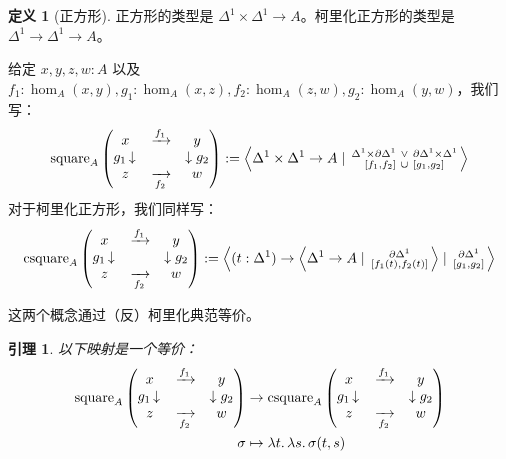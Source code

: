 \documentclass{ctexrep}
\theoremstyle{plain}
\newtheorem{lemma}[theorem]{引理}
\theoremstyle{definition}
\newtheorem{definition}[theorem]{定义}
\theoremstyle{remark}
\theoremstyle{definition}
\theoremstyle{definition}
\theoremstyle{definition}
\begin{document}
\begin{definition}[正方形]
正方形的类型是 $\Delta^1 \times \Delta^1 \to A$。柯里化正方形的类型是 $\Delta^1 \to \Delta^1 \to A$。

给定 $x,y,z,w:A$ 以及 $f_1:\hom_A(x,y), g_1:\hom_A(x,z), f_2:\hom_A(z,w), g_2:\hom_A(y,w)$，我们写：
\[
\text{square}_A \left( 
\begin{matrix} 
x & \xrightarrow{f_1} & y \\ 
g_1 \left\downarrow \rule{0pt}{1.5ex} \right. & & \left\downarrow \rule{0pt}{1.5ex} \right. g_2 \\ 
z & \xrightarrow[f_2]{} & w 
\end{matrix} 
\right) := \left\langle \Delta^1 \times \Delta^1 \to A \mid \begin{smallmatrix} \Delta^1 \times \partial\Delta^1 \ \lor \ \partial\Delta^1 \times \Delta^1 \\ [f_1, f_2] \ \cup \ [g_1, g_2] \end{smallmatrix} \right\rangle
\]
对于柯里化正方形，我们同样写：
\[
\text{csquare}_A \left( 
\begin{matrix} 
x & \xrightarrow{f_1} & y \\ 
g_1 \left\downarrow \rule{0pt}{1.5ex} \right. & & \left\downarrow \rule{0pt}{1.5ex} \right. g_2 \\ 
z & \xrightarrow[f_2]{} & w 
\end{matrix} 
\right) := \left\langle (t : \Delta^1) \to \left\langle \Delta^1 \to A \mid \begin{smallmatrix} \partial\Delta^1 \\ [f_1(t), f_2(t)] \end{smallmatrix} \right\rangle \mid \begin{smallmatrix} \partial\Delta^1 \\ [g_1, g_2] \end{smallmatrix} \right\rangle
\]
\end{definition}

这两个概念通过（反）柯里化典范等价。

\begin{lemma}
以下映射是一个等价：
\begin{align*}
\text{square}_A \left( 
\begin{matrix} 
x & \xrightarrow{f_1} & y \\ 
g_1 \left\downarrow \rule{0pt}{1.5ex} \right. & & \left\downarrow \rule{0pt}{1.5ex} \right. g_2 \\ 
z & \xrightarrow[f_2]{} & w 
\end{matrix} 
\right) &\to \text{csquare}_A \left( 
\begin{matrix} 
x & \xrightarrow{f_1} & y \\ 
g_1 \left\downarrow \rule{0pt}{1.5ex} \right. & & \left\downarrow \rule{0pt}{1.5ex} \right. g_2 \\ 
z & \xrightarrow[f_2]{} & w 
\end{matrix} 
\right) \\
\sigma &\mapsto \lambda t. \, \lambda s. \, \sigma(t, s)
\end{align*}
\end{lemma}
\end{document}
